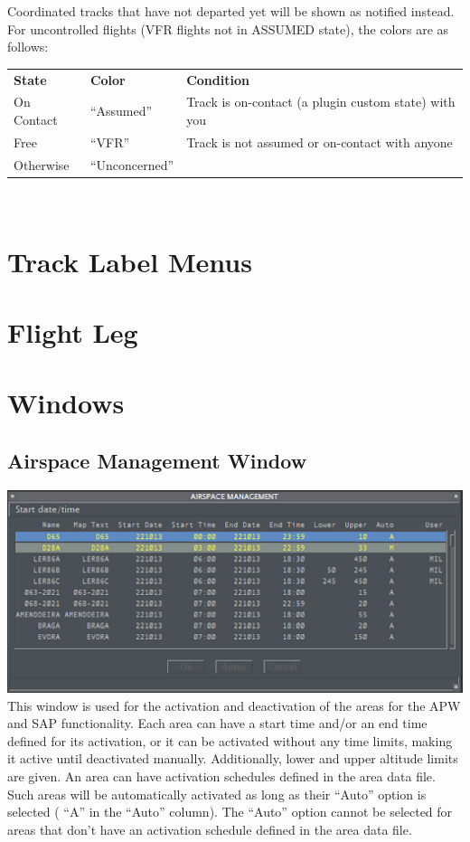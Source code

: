 \documentclass[11pt,a4paper,oldfontcommands]{memoir}
\begin{document}
Coordinated tracks that have not departed yet will be shown as notified instead.\\

For uncontrolled flights (VFR flights not in ASSUMED state), the colors are as follows:\\
\begin{tabular}{p{5cm}p{5cm}p{5cm}}
\textbf{State}  & \textbf{Color}    & \textbf{Condition}
\\On Contact    & “Assumed”         & Track is on-contact (a plugin custom state) with you
\\Free          & “VFR”             & Track is not assumed or on-contact with anyone
\\Otherwise     & “Unconcerned”     &
\end{tabular}\\

\section{Track Label Menus}

\section{Flight Leg}

\section{Windows}

\subsection{Airspace Management Window}
\label{menu:tsa}
\includegraphics{img/tsa.png}\\
This window is used for the activation and deactivation of the areas for the APW and SAP functionality. Each area can have a start time and/or an end time defined for its activation, or it can be activated without any time limits, making it active until deactivated manually. Additionally, lower and upper altitude limits are given. An area can have activation schedules defined in the area data file. Such areas will be automatically activated as long as their “Auto” option is selected ( “A” in the “Auto” column). The “Auto” option cannot be selected for areas that don’t have an activation schedule defined in the area data file.
\end{document}
